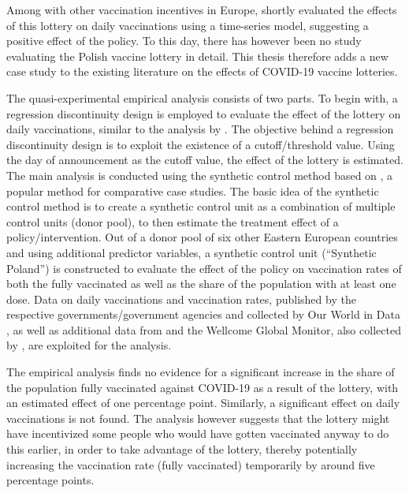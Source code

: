 \documentclass{scrbook}
\begin{document}
Among with other vaccination incentives in Europe,
\textcite{kuznetsova_effectiveness_2022} shortly evaluated the effects
of this lottery on daily vaccinations using a time-series model,
suggesting a positive effect of the policy. To this day, there has
however been no study evaluating the Polish vaccine lottery in detail.
This thesis therefore adds a new case study to the existing literature
on the effects of COVID-19 vaccine lotteries.

The quasi-experimental empirical analysis consists of two parts. To
begin with, a regression discontinuity design is employed to evaluate
the effect of the lottery on daily vaccinations, similar to the analysis
by \textcite{kuznetsova_effectiveness_2022}. The objective behind a
regression discontinuity design is to exploit the existence of a
cutoff/threshold value. Using the day of announcement as the cutoff
value, the effect of the lottery is estimated. The main analysis is
conducted using the synthetic control method based on
\textcite{abadie_economic_2003}, a popular method for comparative case
studies. The basic idea of the synthetic control method is to create a
synthetic control unit as a combination of multiple control units (donor
pool), to then estimate the treatment effect of a policy/intervention.
Out of a donor pool of six other Eastern European countries and using
additional predictor variables, a synthetic control unit (``Synthetic
Poland'') is constructed to evaluate the effect of the policy on
vaccination rates of both the fully vaccinated as well as the share of
the population with at least one dose. Data on daily vaccinations and
vaccination rates, published by the respective governments/government
agencies and collected by Our World in Data
\parencite{mathieu_global_2021}, as well as additional data from
\textcite{eurostat_eurostat_2023} and the Wellcome Global Monitor, also
collected by \textcite{our_world_in_data_share_2020}, are exploited for
the analysis.

The empirical analysis finds no evidence for a significant increase in
the share of the population fully vaccinated against COVID-19 as a
result of the lottery, with an estimated effect of one percentage point.
Similarly, a significant effect on daily vaccinations is not found. The
analysis however suggests that the lottery might have incentivized some
people who would have gotten vaccinated anyway to do this earlier, in
order to take advantage of the lottery, thereby potentially increasing
the vaccination rate (fully vaccinated) temporarily by around five
percentage points.
\end{document}
